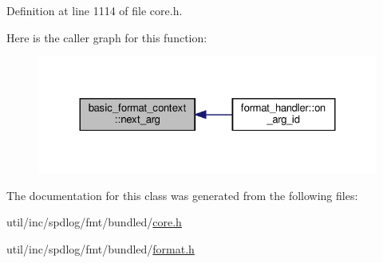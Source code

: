Definition at line 1114 of file core.\+h.

Here is the caller graph for this function\+:
\nopagebreak
\begin{figure}[H]
\begin{center}
\leavevmode
\includegraphics[width=324pt]{classbasic__format__context_a38f34ffad997ca2d16cefc33ab240f89_icgraph}
\end{center}
\end{figure}


The documentation for this class was generated from the following files\+:\begin{DoxyCompactItemize}
\item 
util/inc/spdlog/fmt/bundled/\hyperlink{core_8h}{core.\+h}\item 
util/inc/spdlog/fmt/bundled/\hyperlink{format_8h}{format.\+h}\end{DoxyCompactItemize}
